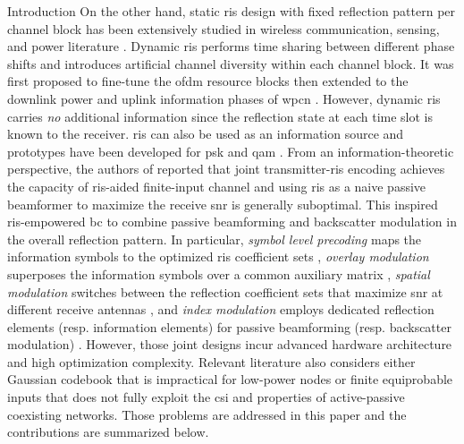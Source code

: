 \documentclass[journal]{IEEEtran}
\begin{document}
\begin{section}{Introduction}
	On the other hand, static \gls{ris} design with fixed reflection pattern per channel block has been extensively studied in wireless communication, sensing, and power literature \cite{Wu2018,Zhang2019a,Lin2022,Liu2022,Feng2022,Zhao2022}.
	Dynamic \gls{ris} performs time sharing between different phase shifts and introduces artificial channel diversity within each channel block.
	It was first proposed to fine-tune the \gls{ofdm} resource blocks \cite{Yang2020} then extended to the downlink power and uplink information phases of \gls{wpcn} \cite{Wu2021,Wu2021d,Hua2022a}.
	However, dynamic \gls{ris} carries \emph{no} additional information since the reflection state at each time slot is known to the receiver.
	\gls{ris} can also be used as an information source and prototypes have been developed for \gls{psk} \cite{Tang2019a} and \gls{qam} \cite{Dai2020a}.
	From an information-theoretic perspective, the authors of \cite{Karasik2020} reported that joint transmitter-\gls{ris} encoding achieves the capacity of \gls{ris}-aided finite-input channel and using \gls{ris} as a naive passive beamformer to maximize the receive \gls{snr} is generally suboptimal.
	This inspired \gls{ris}-empowered \gls{bc} \cite{Liu2019d,Bereyhi2020,Xu2020b,Zhang2021d,Hu2021b,Hua2022,Basar2020,Ma2020a,Yuan2021,Hu2021a} to combine passive beamforming and backscatter modulation in the overall reflection pattern.
	In particular, \emph{symbol level precoding} maps the information symbols to the optimized \gls{ris} coefficient sets \cite{Liu2019d,Bereyhi2020}, \emph{overlay modulation} superposes the information symbols over a common auxiliary matrix \cite{Xu2020b,Zhang2021d,Hu2021b,Hua2022}, \emph{spatial modulation} switches between the reflection coefficient sets that maximize \gls{snr} at different receive antennas \cite{Basar2020,Ma2020a,Yuan2021}, and \emph{index modulation} employs dedicated reflection elements (resp. information elements) for passive beamforming (resp. backscatter modulation) \cite{Hu2021a}.
	However, those joint designs incur advanced hardware architecture and high optimization complexity.
	Relevant literature also considers either Gaussian codebook \cite{Guo2019b,Ding2020,Long2020a,Zhou2019a,Wu2021a,Xu2021a,Yang2021a,Hu2021b} that is impractical for low-power nodes or finite equiprobable inputs \cite{Yang2018,Liang2020,Han2021,Zhang2022,Liu2019d,Bereyhi2020,Xu2020b,Zhang2021d,Hua2022,Basar2020,Ma2020a,Yuan2021,Hu2021a} that does not fully exploit the \gls{csi} and properties of active-passive coexisting networks.
	Those problems are addressed in this paper and the contributions are summarized below.


\end{section}
\end{document}
